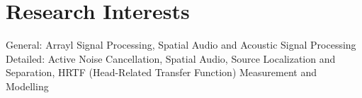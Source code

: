 \documentclass[11pt]{article}
\begin{document}
\section*{Research Interests}
General: Arrayl Signal Processing, Spatial Audio and Acoustic Signal Processing\\
Detailed: Active Noise Cancellation, Spatial Audio, Source Localization and Separation, HRTF (Head-Related Transfer Function) Measurement and Modelling

%

\end{document}
